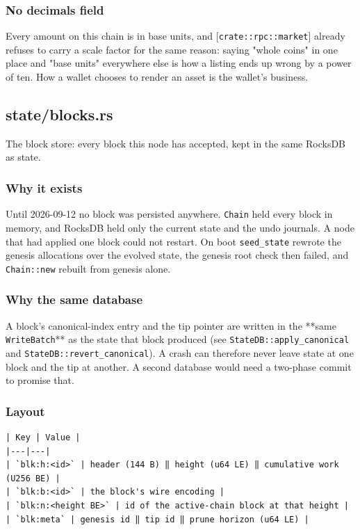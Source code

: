 \documentclass[11pt,a4paper]{article}
\begin{document}
\subsubsection{No decimals field}

Every amount on this chain is in base units, and [\texttt{crate::rpc::market}]
already refuses to carry a scale factor for the same reason: saying "whole
coins" in one place and "base units" everywhere else is how a listing ends
up wrong by a power of ten. How a wallet chooses to render an asset is the
wallet's business.

\subsection{state/blocks.rs}
The block store: every block this node has accepted, kept in the same
RocksDB as state.

\subsubsection{Why it exists}

Until 2026-09-12 no block was persisted anywhere. \texttt{Chain} held every block
in memory, and RocksDB held only the current state and the undo journals. A
node that had applied one block could not restart. On boot \texttt{seed\_state}
rewrote the genesis allocations over the evolved state, the genesis root
check then failed, and \texttt{Chain::new} rebuilt from genesis alone.

\subsubsection{Why the same database}

A block's canonical-index entry and the tip pointer are written in the
**same \texttt{WriteBatch}** as the state that block produced (see
\texttt{StateDB::apply\_canonical} and \texttt{StateDB::revert\_canonical}). A crash can
therefore never leave state at one block and the tip at another. A second
database would need a two-phase commit to promise that.

\subsubsection{Layout}

\begin{verbatim}
| Key | Value |
|---|---|
| `blk:h:<id>` | header (144 B) ‖ height (u64 LE) ‖ cumulative work (U256 BE) |
| `blk:b:<id>` | the block's wire encoding |
| `blk:n:<height BE>` | id of the active-chain block at that height |
| `blk:meta` | genesis id ‖ tip id ‖ prune horizon (u64 LE) |
\end{verbatim}
\end{document}
